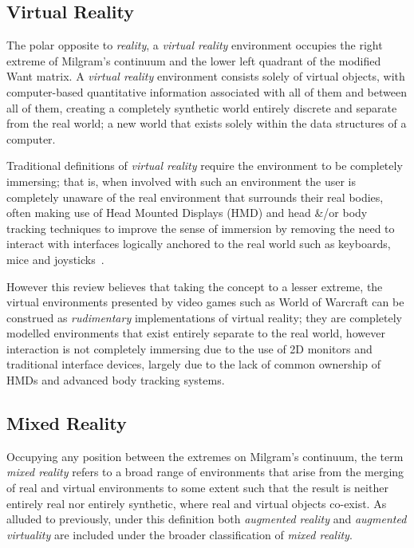 \subsection{Virtual Reality}
The polar opposite to \textit{reality}, a \textit{virtual reality} environment occupies the right extreme of Milgram's continuum and the lower left quadrant of the modified Want matrix. A \textit{virtual reality} environment consists solely of virtual objects, with computer-based quantitative information associated with all of them and between all of them, creating a completely synthetic world entirely discrete and separate from the real world; a new world that exists solely within the data structures of a computer.%

Traditional definitions of \textit{virtual reality} require the environment to be completely immersing; that is, when involved with such an environment the user is completely unaware of the real environment that surrounds their real bodies, often making use of Head Mounted Displays (HMD) and head \&/or body tracking techniques to improve the sense of immersion by removing the need to interact with interfaces logically anchored to the real world such as keyboards, mice and joysticks~\cite{Druck2006}.

However this review believes that taking the concept to a lesser extreme, the virtual environments presented by video games such as World of Warcraft can be construed as \textit{rudimentary} implementations of virtual reality; they are completely modelled environments that exist entirely separate to the real world, however interaction is not completely immersing due to the use of 2D monitors and traditional interface devices, largely due to the lack of common ownership of HMDs and advanced body tracking systems.

\subsection{Mixed Reality}
Occupying any position between the extremes on Milgram's continuum, the term \textit{mixed reality} refers to a broad range of environments that arise from the merging of real and virtual environments to some extent such that the result is neither entirely real nor entirely synthetic, where real and virtual objects co-exist. As alluded to previously, under this definition both \textit{augmented reality} and \textit{augmented virtuality} are included under the broader classification of \textit{mixed reality}.


